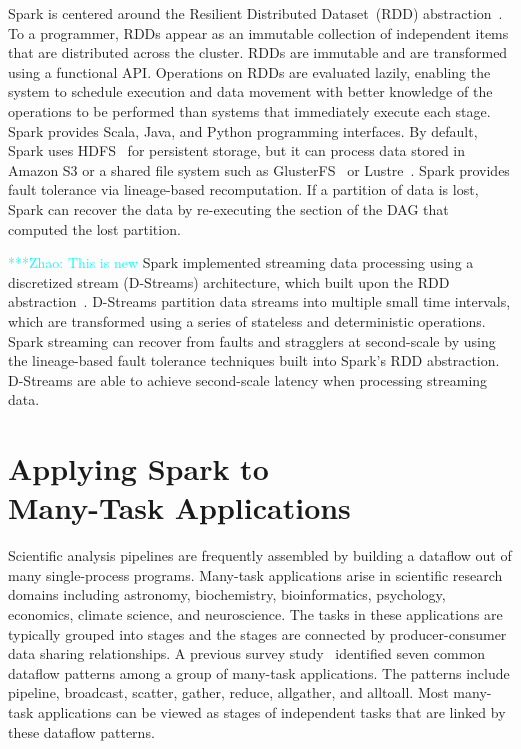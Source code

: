 \documentclass[10pt,journal,compsoc]{IEEEtran}
\newcommand{\zhaonote}[1]{{\textcolor{cyan}    { ***Zhao:      #1 }}}
\newcommand{\zhaonote}[1]{}
\begin{document}
Spark is centered around the Resilient Distributed Dataset~(RDD) abstraction~\cite{zaharia12}.
To a programmer, RDDs appear as an immutable collection of independent items that are 
distributed across the cluster. RDDs are immutable and are transformed using a
functional API. Operations on RDDs are evaluated lazily, enabling the system to schedule 
execution and data movement with better knowledge of the operations to be performed than 
systems that immediately execute each stage. Spark provides Scala, Java, and Python programming interfaces.
By default, Spark uses HDFS~\cite{shvachko10} for persistent storage, but
it can process data stored in Amazon S3 or a shared file system such as
GlusterFS~\cite{davies13} or Lustre~\cite{donovan03}. Spark provides fault tolerance via
lineage-based recomputation. If a partition of data is lost, Spark can recover the data
by re-executing the section of the DAG that computed the lost partition.

\zhaonote{This is new}
Spark implemented streaming data processing using a discretized stream (D-Streams) architecture, which built upon the
RDD abstraction~\cite{zaharia13}.
D-Streams partition data streams into multiple small time intervals, which are transformed using a series of stateless and deterministic operations.
Spark streaming can recover from faults and stragglers at second-scale by using the lineage-based fault tolerance techniques
built into Spark's RDD abstraction. D-Streams are able to achieve second-scale latency when processing streaming data.

\section{Applying Spark to \\ Many-Task Applications}
\label{sec:Capability}

Scientific analysis pipelines are frequently assembled by building a dataflow out of many
single-process programs. Many-task applications arise in scientific research
domains including astronomy, biochemistry, bioinformatics, psychology, economics, climate science,
and neuroscience. The tasks in these applications are typically grouped into stages and the stages are connected by
producer-consumer data sharing relationships. 
A previous survey study~\cite{katz11} identified
seven common dataflow patterns among a group of many-task applications. The patterns
include pipeline, broadcast, scatter, gather,
reduce, allgather, and alltoall. Most many-task applications
can be viewed as stages of independent tasks that are linked by these dataflow patterns.
\end{document}
